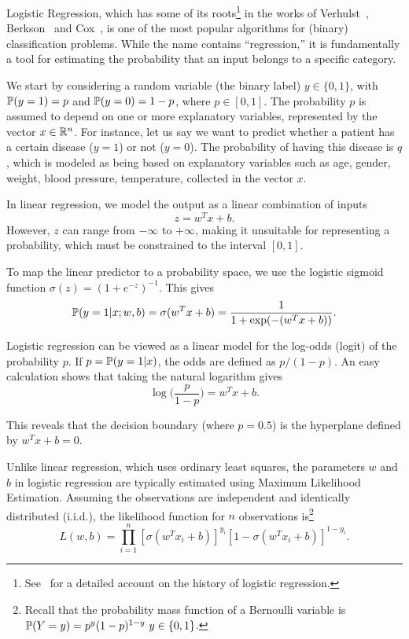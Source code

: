Logistic Regression, which has some of its roots\footnote{See~\cite{Cramer2002} for a detailed account on the history of logistic regression.} in the works of  Verhulst~\cite{verhulst1844recherches}, Berkson~\cite{berkson1944application} and Cox~\cite{cox1958regression}, is one of the most popular algorithms for (binary) classification problems.
 While the name contains ``regression,'' it is fundamentally a tool for estimating the probability that an input belongs to a specific category.

We start by considering a random variable (the binary label) $y\in \{0,1\}$, with $\P(y=1) = p$ and $\P(y=0) = 1-p$,
where $p \in [0,1]$. The probability $p$ is assumed to depend on one or more explanatory variables, represented by the vector $x \in \R^n$. For instance, let us say we want to predict whether a patient has a certain disease ($y=1$) or not ($y = 0$). The probability of having this disease is $q$, which is modeled as being based on explanatory variables such as age, gender, weight,  blood pressure, temperature, collected in the vector $x.$

In linear regression, we model the output as a linear combination of inputs 
$$z = w^T x + b.$$ 
However, $z$ can range from $-\infty$ to $+\infty$, making it unsuitable for representing a probability, which must be constrained to the interval $[0, 1]$.

To map the linear predictor to a probability space, we use the logistic sigmoid function $\sigma(z)
= (1 + e^{-z})^{-1}$.
This gives
$$\P(y=1 | x; w,b) = \sigma(w^T x + b) = \frac{1}{1 + \exp(-(w^T x + b))}.$$


Logistic regression can be viewed as a linear model for the log-odds (logit) of the probability $p$. If $p = \P(y=1|x)$, the odds are defined as $p/(1-p)$. An easy calculation shows that taking the natural logarithm gives
$$\log\Big( \frac{p}{1-p} \Big) = w^T x + b.$$

This reveals that the decision boundary (where $p=0.5$) is the hyperplane defined by $w^T x + b = 0$.


Unlike linear regression, which uses ordinary least squares, the parameters $w$ and $b$ in logistic regression are typically estimated using Maximum Likelihood Estimation. Assuming the observations are independent and identically distributed (i.i.d.), the likelihood function for $n$ observations is\footnote{Recall that the probability mass function of a Bernoulli variable is $\P(Y=y) = p^y (1-p)^{1-y}\,\, y \in \{0,1\}$.}
$$L(w,b) = \prod_{i=1}^n [\sigma(w^T x_i + b)]^{y_i} [1 - \sigma(w^T x_i + b)]^{1 - y_i}.$$

